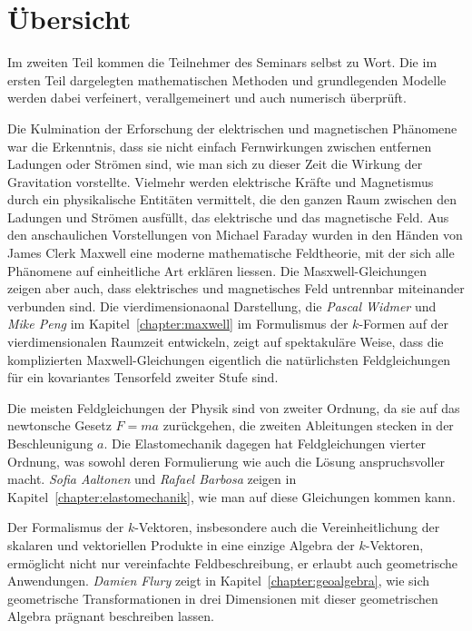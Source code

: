%
%
%
\chapter*{Übersicht}
\fancyhead[RE]{}
\label{buch:uebersicht}
Im zweiten Teil kommen die Teilnehmer des Seminars selbst zu Wort.
Die im ersten Teil dargelegten mathematischen Methoden und
grundlegenden Modelle werden dabei verfeinert, verallgemeinert
und auch numerisch überprüft.

Die Kulmination der Erforschung der elektrischen und magnetischen
Phänomene war die Erkenntnis, dass sie nicht einfach Fernwirkungen
zwischen entfernen Ladungen oder Strömen sind, wie man sich zu
dieser Zeit die Wirkung der Gravitation vorstellte.
Vielmehr werden elektrische Kräfte und Magnetismus durch ein
physikalische Entitäten vermittelt, die den ganzen Raum zwischen den
Ladungen und Strömen ausfüllt, das elektrische und das magnetische
Feld.
Aus den anschaulichen Vorstellungen von Michael Faraday wurden in den
%
Händen von James Clerk Maxwell eine moderne mathematische Feldtheorie,
%
mit der sich alle Phänomene auf einheitliche Art erklären liessen.
Die Masxwell-Gleichungen zeigen aber auch, dass elektrisches und
magnetisches Feld untrennbar miteinander verbunden sind.
Die vierdimensionaonal Darstellung, die \emph{Pascal Widmer}
%
%
und \emph{Mike Peng}
%
%
im Kapitel~\ref{chapter:maxwell} im Formulismus der $k$-Formen auf
der vierdimensionalen Raumzeit entwickeln, zeigt auf spektakuläre
Weise, dass die komplizierten Maxwell-Gleichungen eigentlich die
natürlichsten Feldgleichungen für ein kovariantes Tensorfeld zweiter
Stufe sind.

Die meisten Feldgleichungen der Physik sind von zweiter Ordnung, da
sie auf das newtonsche Gesetz $F=ma$ zurückgehen, die zweiten
Ableitungen stecken in der Beschleunigung $a$.
Die Elastomechanik dagegen hat Feldgleichungen vierter Ordnung,
%
was sowohl deren Formulierung wie auch die Lösung anspruchsvoller
macht.
\emph{Sofia Aaltonen}
%
%
und
\emph{Rafael Barbosa}
%
%
zeigen in Kapitel~\ref{chapter:elastomechanik}, wie man auf diese
Gleichungen kommen kann.

Der Formalismus der $k$-Vektoren, insbesondere auch die Vereinheitlichung
der skalaren und vektoriellen Produkte in eine einzige Algebra der
$k$-Vektoren, ermöglicht nicht nur vereinfachte Feldbeschreibung,
er erlaubt auch geometrische Anwendungen.
\emph{Damien Flury} zeigt in Kapitel~\ref{chapter:geoalgebra}, wie
%
%
sich geometrische Transformationen in drei Dimensionen mit dieser 
%
geometrischen Algebra prägnant beschreiben lassen.

